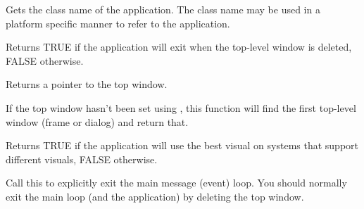 \label{wxappgetclassname}


Gets the class name of the application. The class name may be used in a platform specific
manner to refer to the application.



\label{wxappgetexitonframedelete}


Returns TRUE if the application will exit when the top-level window is deleted, FALSE
otherwise.



\label{wxappgettopwindow}


Returns a pointer to the top window.


If the top window hasn't been set using , this
function will find the first top-level window (frame or dialog) and return that.



\label{wxappgetusebestvisual}


Returns TRUE if the application will use the best visual on systems that support
different visuals, FALSE otherwise.



\label{wxappexitmainloop}


Call this to explicitly exit the main message (event) loop.
You should normally exit the main loop (and the application) by deleting
the top window.

\label{wxappinitialized}

